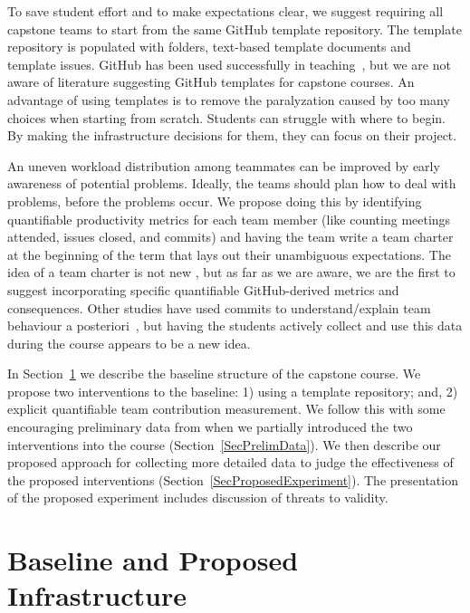 \documentclass[10pt, conference]{IEEEtran}
\begin{document}
To save student effort and to make expectations clear, we suggest requiring all
capstone teams to start from the same GitHub template repository.  The template
repository is populated with folders, text-based template documents and template
issues.  GitHub has been used successfully in
teaching~\cite{tushevUsingGitHubLarge2020,
gitinabardStudentTeamworkProgramming2020, felicianoStudentExperiencesUsing2016,
xuUsingGitManage2012}, but we are not aware of literature suggesting GitHub
templates for capstone courses.  An advantage of using templates is to remove
the paralyzation caused by too many choices when starting from scratch. Students
can struggle with where to begin.  By making the infrastructure decisions for
them, they can focus on their project.

An uneven workload distribution among teammates can be improved by early
awareness of potential problems. Ideally, the teams should plan how to deal with
problems, before the problems occur.  We propose doing this by identifying
quantifiable productivity metrics for each team member (like counting meetings
attended, issues closed, and commits) and having the team write a team charter
at the beginning of the term that lays out their unambiguous expectations.  The
idea of a team charter is not new \cite{mathieuLayingFoundationSuccessful2009,
johnsonTeamChartersHelp2022, hughstonEmpiricalStudyTeam2013}, but as far as we
are aware, we are the first to suggest incorporating specific quantifiable
GitHub-derived metrics and consequences. Other studies have used commits to
understand/explain team behaviour a
posteriori~\cite{gitinabardStudentTeamworkProgramming2020,
tushevUsingGitHubLarge2020}, but having the students actively collect and use
this data during the course appears to be a new idea.

In Section~\ref{SecInfrastruct} we describe the baseline structure of the
capstone course.  We propose two interventions to the baseline: 1) using a
template repository; and, 2) explicit quantifiable team contribution
measurement. We follow this with some encouraging preliminary data from when we
partially introduced the two interventions into the course
(Section~\ref{SecPrelimData}).  We then describe our proposed approach for
collecting more detailed data to judge the effectiveness of the proposed
interventions (Section~\ref{SecProposedExperiment}). The presentation of the
proposed experiment includes discussion of threats to validity.

\section{Baseline and Proposed Infrastructure} \label{SecInfrastruct}
\end{document}

